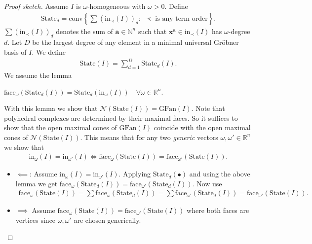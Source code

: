 \documentclass[a4paper, 11pt]{article}
\begin{document}
\begin{proof}[Proof sketch]
  Assume \( I \) is \( \omega \)-homogeneous with \( \omega > 0 \).
  Define 
  \begin{align*}
    \mathrm{State}_{d} = 
      \mathrm{conv}\left\{ 
        \sum (\mathrm{in}_\prec(I))_d : \; \prec \text{ is any term order}
       \right\}.
  \end{align*}
  \(   \sum (\mathrm{in}_\prec(I))_d \) denotes the sum of \( \mathbf a \in \mathbb N^n \) such that \(\mathbf x^{\mathbf a} \in \mathrm{in}_\prec(I) \) has \( \omega \)-degree \( d \). Let \( D \) be the largest degree of any element in a minimal universal Gröbner basis of \( I \). We define 
  \begin{align*}
    \mathrm{State}(I) = \sum^D_{d=1} \mathrm{State}_d(I).
  \end{align*}
  We assume the lemma 
  \begin{lemma}
    \( \mathrm{face}_\omega(\mathrm{State}_d(I)) = \mathrm{State}_d(\mathrm{in}_\omega(I)) \quad \forall \omega \in \mathbb R^n \).
  \end{lemma}
  With this lemma we show that \( \mathcal{N}(\mathrm{State}(I)) = \mathrm{GFan}(I) \). Note that polyhedral complexes are determined by their maximal faces. So it suffices to show that the open maximal cones of \( \mathrm{GFan}(I) \) coincide with the open maximal cones of \( \mathcal{N}(\mathrm{State}(I)) \). This means that for any two \emph{generic} vectors \( \omega, \omega' \in \mathbb R^n \) we show that 
  \begin{align*}
    \mathrm{in}_\omega(I) = \mathrm{in}_{\omega'}(I) \iff 
    \mathrm{face}_\omega(\mathrm{State}(I)) = \mathrm{face}_{\omega'}(\mathrm{State}(I)).
  \end{align*}
  \begin{itemize}
    \item \( \impliedby \): Assume \(  \mathrm{in}_\omega(I) = \mathrm{in}_{\omega'}(I) \). Applying \( \mathrm{State}_d(\bullet) \) and using the above lemma we get \(       \mathrm{face}_\omega(\mathrm{State}_d(I)) =\mathrm{face}_{\omega'}(\mathrm{State}_d(I))
    \). Now use 
    \begin{align*}
      \mathrm{face}_\omega(\mathrm{State}(I)) = \sum \mathrm{face}_\omega(\mathrm{State}_d(I)) = \sum \mathrm{face}_{\omega'}(\mathrm{State}_d(I)) = \mathrm{face}_{\omega'}(\mathrm{State}(I)) .
    \end{align*}

    \item \( \implies \) Assume \( \mathrm{face}_\omega(\mathrm{State}(I)) = \mathrm{face}_{\omega'}(\mathrm{State}(I)) \) where both faces are vertices since \( \omega, \omega' \) are chosen generically.
    

\end{itemize}
\end{proof}
\end{document}
